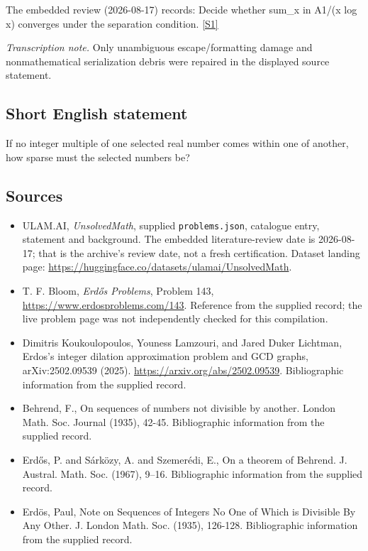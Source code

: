 \documentclass[11pt,a4paper]{article}
\newcommand{\sref}[2]{\hyperlink{source:#1:#2}{[S#2]}}
\begin{document}
The embedded review (2026-08-17) records: Decide whether sum\_{x in A}1/(x log x) converges under the separation condition. \sref{statement}{1}

{\small\emph{Transcription note.} Only unambiguous escape/formatting damage and nonmathematical serialization debris were repaired in the displayed source statement.}

\subsection{Short English statement}

If no integer multiple of one selected real number comes within one of another, how sparse must the selected numbers be?

\subsection{Sources}

{\small

\begin{itemize}

\item[\hypertarget{source:statement:1}{S1}] ULAM.AI, \emph{UnsolvedMath}, supplied \texttt{problems.json}, catalogue entry, statement and background. The embedded literature-review date is 2026-08-17; that is the archive’s review date, not a fresh certification. Dataset landing page: \url{https://huggingface.co/datasets/ulamai/UnsolvedMath}.

\item[\hypertarget{source:statement:2}{S2}] T. F. Bloom, \emph{Erdős Problems}, Problem 143, \url{https://www.erdosproblems.com/143}. Reference from the supplied record; the live problem page was not independently checked for this compilation.

\item[\hypertarget{source:statement:3}{S3}] Dimitris Koukoulopoulos, Youness Lamzouri, and Jared Duker Lichtman, Erdos's integer dilation approximation problem and GCD graphs, arXiv:2502.09539 (2025). \url{https://arxiv.org/abs/2502.09539}. Bibliographic information from the supplied record.

\item[\hypertarget{source:statement:4}{S4}] Behrend, F., On sequences of numbers not divisible by another. London Math. Soc. Journal (1935), 42-45. Bibliographic information from the supplied record.

\item[\hypertarget{source:statement:5}{S5}] Erd\H{o}s, P. and S\'{a}rk\"{o}zy, A. and Szemer\'{e}di, E., On a theorem of Behrend. J. Austral. Math. Soc. (1967), 9--16. Bibliographic information from the supplied record.

\item[\hypertarget{source:statement:6}{S6}] Erd\"{o}s, Paul, Note on Sequences of Integers No One of Which is Divisible By Any Other. J. London Math. Soc. (1935), 126-128. Bibliographic information from the supplied record.

\end{itemize}

}

\label{end:statement}
\end{document}
